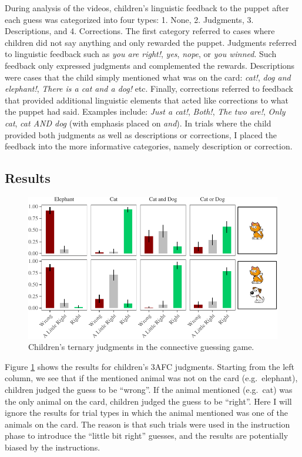 \documentclass[oneside]{report}
\theoremstyle{definition}
\theoremstyle{definition}
\theoremstyle{definition}
\theoremstyle{remark}
\begin{document}
During analysis of the videos, children's linguistic feedback to the
puppet after each guess was categorized into four types: 1. None, 2.
Judgments, 3. Descriptions, and 4. Corrections. The first category
referred to cases where children did not say anything and only rewarded
the puppet. Judgments referred to linguistic feedback such as \emph{you
are right!}, \emph{yes}, \emph{nope}, or \emph{you winned}. Such
feedback only expressed judgments and complemented the rewards.
Descriptions were cases that the child simply mentioned what was on the
card: \emph{cat!}, \emph{dog and elephant!}, \emph{There is a cat and a
dog!} etc. Finally, corrections referred to feedback that provided
additional linguistic elements that acted like corrections to what the
puppet had said. Examples include: \emph{Just a cat!}, \emph{Both!},
\emph{The two are!}, \emph{Only cat}, \emph{cat AND dog} (with emphasis
placed on \emph{and}). In trials where the child provided both judgments
as well as descriptions or corrections, I placed the feedback into the
more informative categories, namely description or correction.

\subsection{Results}\label{results-1}
\begin{figure}[t]

{\centering \includegraphics{figs/childrenTernaryPlot-1} 

}

\caption{Children's ternary judgments in the connective guessing game.}\label{fig:childrenTernaryPlot}
\end{figure}
Figure \ref{fig:childrenTernaryPlot} shows the results for children's
3AFC judgments. Starting from the left column, we see that if the
mentioned animal was not on the card (e.g.~elephant), children judged
the guess to be ``wrong''. If the animal mentioned (e.g.~cat) was the
only animal on the card, children judged the guess to be ``right''. Here
I will ignore the results for trial types in which the animal mentioned
was one of the animals on the card. The reason is that such trials were
used in the instruction phase to introduce the ``little bit right''
guesses, and the results are potentially biased by the instructions.
\end{document}
